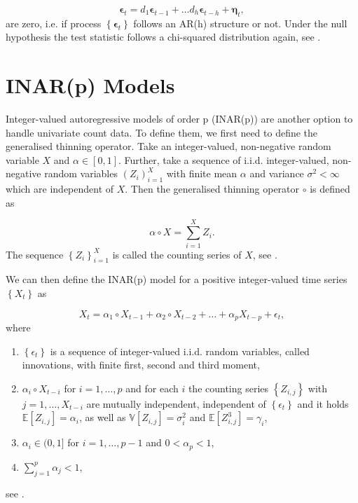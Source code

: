 \begin{equation}
\bm{\epsilon}_t = d_1\bm{\epsilon}_{t-1} +\ldots d_h \bm{\epsilon}_{t-h} + \bm{\eta}_t,
\label{eq:Breusch-Godfrey Test model}
\end{equation}
%
are zero, i.e. if process $\left\{\bm{\epsilon}_t\right\}$ follows an AR(h) structure or not. Under the null hypothesis the test statistic follows a chi-squared distribution again, see \textcite{Lütkepohl:2007}. 

\section{INAR(p) Models}
\label{sec: Inar Models}

Integer-valued autoregressive models of order p (INAR(p)) are another option to handle univariate count data. To define them, we first need to define the generalised thinning operator. Take an integer-valued, non-negative random variable $X$ and $\alpha \in [0,1]$. Further, take a sequence of i.i.d. integer-valued, non-negative random variables $(Z_i)_{i=1}^X$ with finite mean $\alpha$ and variance $\sigma^2<\infty $ which are independent of $X$. Then the generalised thinning operator $\circ$ is defined as

\begin{equation}
\alpha \circ X = \sum_{i=1}^X Z_i .
\label{eq:Thinning operator}
\end{equation}
%
The sequence  $\left\{Z_i \right\}_{i=1}^X$ is called the counting series of $X$, see \textcite{Silva:2005}. 

We can then define the INAR(p) model for a positive integer-valued time series $\left\{X_t \right\}$ as

\begin{equation}
X_t = \alpha_1 \circ X_{t-1} + \alpha_2 \circ X_{t-2} + \ldots + \alpha_p X_{t-p} +\epsilon_t ,
\label{eq:Inar(p) model}
\end{equation}
%
where

\begin{enumerate}
	\item $\left\{\epsilon_t\right\}$ is a sequence of integer-valued i.i.d. random variables, called innovations, with finite first, second and third moment, 
	\item $\alpha_i \circ X_{t-i}$ for $i= 1,\ldots,p$ and for each $i$ the counting series $\left\{Z_{i,j}\right\}$ with $j=1,\ldots,X_{t-i}$ are mutually independent, independent of $\left\{\epsilon_t\right\}$ and it holds $\mathbb{E}[Z_{i,j}]=\alpha_i$, as well as $\mathbb{V}[Z_{i,j}] = \sigma_i^2$ and $\mathbb{E}[Z_{i,j}^3] = \gamma_i$,
	\item $\alpha_i \in (0,1]$ for $i=1,\ldots,p-1$ and $0 < \alpha_p < 1$,
	\item $\sum_{j=1}^p \alpha_j < 1$,
\end{enumerate}
%
see \textcite{Silva:2005}. 

